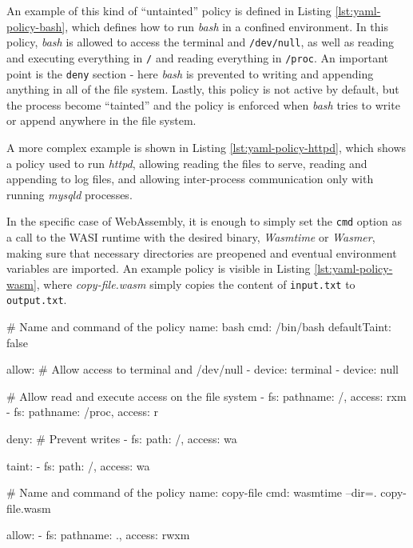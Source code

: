 An example of this kind of ``untainted'' policy is defined in Listing \ref{lst:yaml-policy-bash}, which defines how to
run \textit{bash} in a confined environment.
In this policy, \textit{bash} is allowed to access the terminal and \texttt{/dev/null}, as well
as reading and executing everything in \texttt{/} and reading everything in \texttt{/proc}.
An important point is the \texttt{deny} section - here \textit{bash} is prevented to writing and
appending anything in all of the file system.
Lastly, this policy is not active by default, but the process become ``tainted'' and the policy is enforced
when \textit{bash} tries to write or append anywhere in the file system.

A more complex example is shown in Listing \ref{lst:yaml-policy-httpd}, which shows a policy
used to run \textit{httpd}, allowing reading the files to serve, reading and appending to log files,
and allowing inter-process communication only with running \textit{mysqld} processes.

In the specific case of WebAssembly, it is enough to simply set the \texttt{cmd} option as
a call to the WASI runtime with the desired binary, \textit{Wasmtime} or \textit{Wasmer}, making sure that
necessary directories are preopened and eventual environment variables are imported.
An example policy is visible in Listing \ref{lst:yaml-policy-wasm}, where \textit{copy-file.wasm} simply copies
the content of \texttt{input.txt} to \texttt{output.txt}.

\vspace*{0.5cm}
\begin{code}[language=yaml, caption=A policy for running bash., label=lst:yaml-policy-bash]
# Name and command of the policy
name: bash
cmd: /bin/bash
defaultTaint: false

allow:
  # Allow access to terminal and /dev/null
  - device: terminal
  - device: null

  # Allow read and execute access on the file system
  - fs: {pathname: /, access: rxm}
  - fs: {pathname: /proc, access: r}

deny:
  # Prevent writes
  - fs: {path: /, access: wa}

taint:
  - fs: {path: /, access: wa}
\end{code}

\begin{code}[language=yaml, caption=Running WASM with BPFContain., label=lst:yaml-policy-wasm]
# Name and command of the policy
name: copy-file
cmd: wasmtime --dir=. copy-file.wasm

allow:
  - fs: {pathname: ., access: rwxm}
\end{code}


